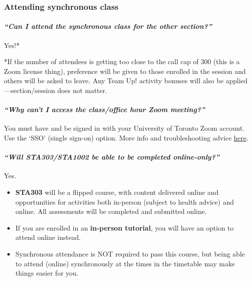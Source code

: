 \documentclass[
  openany]{book}
\begin{document}
\hypertarget{attending-synchronous-class}{%
\subsubsection{Attending synchronous class}\label{attending-synchronous-class}}

\hypertarget{can-i-attend-the-synchronous-class-for-the-other-section}{%
\paragraph{\texorpdfstring{\emph{``Can I attend the synchronous class for the other section?''}}{``Can I attend the synchronous class for the other section?''}}\label{can-i-attend-the-synchronous-class-for-the-other-section}}

Yes!*

*If the number of attendees is getting too close to the call cap of 300 (this is a Zoom license thing), preference will be given to those enrolled in the session and others will be asked to leave. Any Team Up! activity bonuses will also be applied---section/session does not matter.

\hypertarget{why-cant-i-access-the-classoffice-hour-zoom-meeting}{%
\paragraph{\texorpdfstring{\emph{``Why can't I access the class/office hour Zoom meeting?''}}{``Why can't I access the class/office hour Zoom meeting?''}}\label{why-cant-i-access-the-classoffice-hour-zoom-meeting}}

You must have and be signed in with your University of Toronto Zoom account. Use the `SSO' (single sign-on) option. More info and troubleshooting advice \protect\hyperlink{zoomzoomzoomzoom}{here}.

\hypertarget{will-sta303sta1002-be-able-to-be-completed-online-only}{%
\paragraph{\texorpdfstring{\emph{``Will STA303/STA1002 be able to be completed online-only?''}}{``Will STA303/STA1002 be able to be completed online-only?''}}\label{will-sta303sta1002-be-able-to-be-completed-online-only}}

Yes.

\begin{itemize}
\item
  \textbf{STA303} will be a flipped course, with content delivered online and opportunities for activities both in-person (subject to health advice) and online. All assessments will be completed and submitted online.
\item
  If you are enrolled in an \textbf{in-person tutorial}, you will have an option to attend online instead.
\item
  Synchronous attendance is NOT required to pass this course, but being able to attend (online) synchronously at the times in the timetable may make things easier for you.
\end{itemize}
\end{document}
